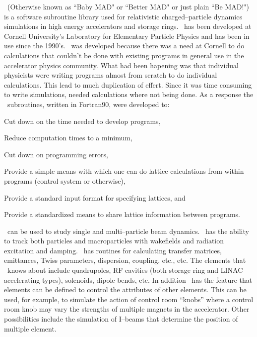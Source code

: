 
\bmad\ (Otherwise known as ``Baby MAD" or ``Better MAD" or just plain
``Be MAD!")  is a software subroutine library used for relativistic
charged--particle dynamics simulations in high energy accelerators and
storage rings. \bmad\ has been developed at Cornell University's
Laboratory for Elementary Particle Physics and has been in use since the
1990's. \bmad\ was developed because there was a need at Cornell to do
calculations that couldn't be done with existing programs in general use
in the accelerator physics community. What had been hapening 
was that individual physicists were writing programs almost from scratch 
to do individual calculations. This lead to much duplication of effert.
Since it was time consuming to write simulations, needed calculations where
not being done. As a response the \bmad\ subroutines, written in
Fortran90, were developed to:
\begin{Itemize}
\item Cut down on the time needed to develop programs,
\item Reduce computation times to a minimum,
\item Cut down on programming errors, 
\item Provide a simple means with which one can do lattice calculations 
from within programs (control system or otherwise),
\item Provide a standard input format for specifying lattices, and
\item Provide a standardized means to share lattice information between 
programs.
\end{Itemize}

\bmad\ can be used to study single and multi--particle beam dynamics.
\bmad\ has the ability to track both particles and macroparticles with
wakefields and radiation excitation and damping. \bmad\ has routines for
calculating transfer matrices, emittances, Twiss parameters, dispersion,
coupling, etc., etc. The elements that \bmad\ knows about include
quadrupoles, RF cavities (both storage ring and LINAC accelerating
types), solenoids, dipole bends, etc. In addition \bmad\ has the feature
that elements can be defined to control the attributes of other
elements. This can be used, for example, to simulate the action of
control room ``knobs'' where a control room knob may vary the strengths
of multiple magnets in the accelerator. Other possibilities include
the simulation of I--beams that determine the position of multiple
element.

\vfill
\break
